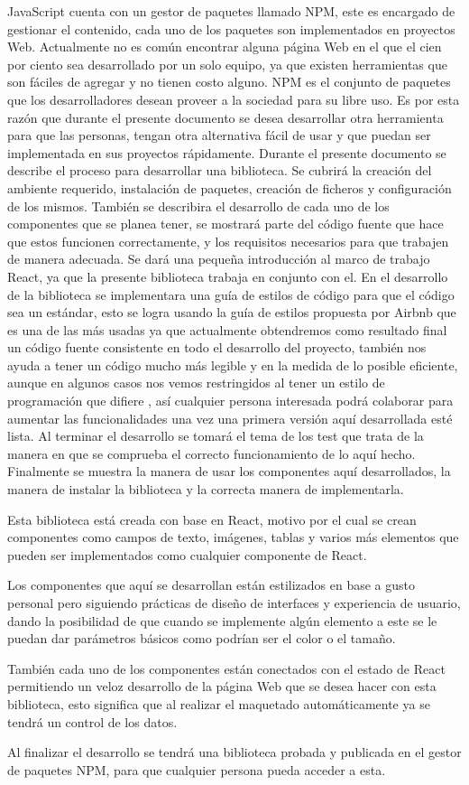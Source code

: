 JavaScript cuenta con un gestor de paquetes llamado NPM, este es encargado de gestionar el contenido, cada uno de los paquetes son  implementados en proyectos Web.
Actualmente no es común encontrar alguna página Web en el que el cien por ciento sea desarrollado por un solo equipo, ya que existen herramientas que son fáciles de agregar y no tienen costo alguno.
NPM es el conjunto de paquetes que los desarrolladores desean proveer a la sociedad para su libre uso.
Es por esta razón que durante el presente documento se desea desarrollar otra herramienta para que las personas, tengan otra alternativa fácil de usar y que puedan ser implementada en sus proyectos rápidamente.
Durante el presente documento se describe el proceso para desarrollar una biblioteca. 
Se cubrirá la creación del ambiente requerido, instalación de paquetes, creación de ficheros y configuración de los mismos. 
También se describira el desarrollo de cada uno de los componentes que se planea tener, se mostrará parte del código fuente que hace que estos funcionen correctamente, y los requisitos necesarios para que trabajen de manera adecuada. 
Se dará una pequeña introducción al marco de trabajo React, ya que la presente biblioteca trabaja en conjunto con el.
En el desarrollo de la biblioteca se implementara una guía de estilos de código para que el código sea un estándar, esto se logra usando la guía de estilos propuesta por Airbnb \cite{airbnb}que es una de las más usadas ya que actualmente obtendremos como resultado final un código fuente consistente en todo el desarrollo del proyecto, también nos ayuda a tener un código mucho más legible y en la medida de lo posible eficiente, aunque en algunos casos nos vemos restringidos al tener un estilo de programación que difiere , así cualquier persona interesada podrá colaborar para aumentar las funcionalidades una vez una primera versión aquí desarrollada esté lista.
Al terminar el desarrollo se tomará el tema de los test que trata de la manera en que se comprueba el correcto funcionamiento de lo aquí hecho.
Finalmente se muestra la manera de usar los componentes aquí desarrollados, la manera de instalar la biblioteca y la correcta manera de implementarla.

Esta biblioteca está creada con base en React, motivo por el cual se crean componentes como campos de texto, imágenes, tablas y varios más elementos que pueden ser implementados como cualquier componente de React. 

Los componentes que aquí se desarrollan están estilizados en base a gusto personal pero siguiendo prácticas de diseño de interfaces y experiencia de usuario, dando la posibilidad de que cuando se implemente algún elemento a este se le puedan dar parámetros básicos como podrían ser el color o el tamaño.

También cada uno de los componentes están conectados con el estado de React permitiendo un veloz desarrollo de la página Web que se desea hacer con esta biblioteca, esto significa que al realizar el maquetado automáticamente ya se tendrá un control de los datos.

Al finalizar el desarrollo se tendrá una biblioteca probada y publicada en el gestor de paquetes NPM, para que cualquier persona pueda acceder a esta.